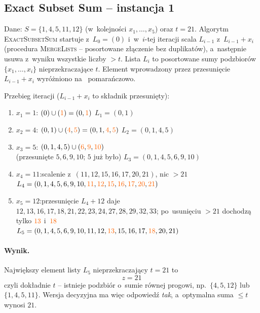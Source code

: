\subsection{Exact Subset Sum -- instancja 1}

Dane: $S = \{1, 4, 5, 11, 12\}$ (w~kolejności $x_1, \ldots, x_5$) oraz $t = 21$.
Algorytm \textsc{ExactSubsetSum} startuje z~$L_0 = (0)$ i~w~$i$-tej iteracji
scala $L_{i-1}$ z~$L_{i-1} + x_i$ (procedura \textsc{MergeLists} -- posortowane
złączenie bez duplikatów), a~następnie usuwa z~wyniku wszystkie liczby $> t$.
Lista $L_i$ to posortowane sumy podzbiorów $\{x_1, \ldots, x_i\}$ nieprzekraczające
$t$. Element wprowadzony przez przesunięcie $L_{i-1} + x_i$ wyróżniono na~%
\textcolor{accentB}{pomarańczowo}.

\begin{dygresja}
	Przebieg iteracji ($L_{i-1} + x_i$ to składnik przesunięty):
	\begin{enumerate}[nosep]
		\item $x_1 = 1$:\quad
		      $(0) \cup (\textcolor{accentB}{1}) = (0, \textcolor{accentB}{1})$
		      \hfill $L_1 = (0, 1)$
		\item $x_2 = 4$:\quad
		      $(0, 1) \cup (\textcolor{accentB}{4}, \textcolor{accentB}{5})
		      = (0, 1, \textcolor{accentB}{4}, \textcolor{accentB}{5})$
		      \hfill $L_2 = (0, 1, 4, 5)$
		\item $x_3 = 5$:\quad
		      $(0, 1, 4, 5) \cup (\textcolor{accentB}{6}, \textcolor{accentB}{9},
		      \textcolor{accentB}{10})$ \\
		      (przesunięte $5, 6, 9, 10$; $5$ już było)
		      \hfill $L_3 = (0, 1, 4, 5, 6, 9, 10)$
		\item $x_4 = 11$:\quad scalenie z~$(11, 12, 15, 16, 17, 20, 21)$, nic $> 21$
		      \hfill\\
		      $L_4 = (0, 1, 4, 5, 6, 9, 10, \textcolor{accentB}{11},
		      \textcolor{accentB}{12}, \textcolor{accentB}{15},
		      \textcolor{accentB}{16}, \textcolor{accentB}{17},
		      \textcolor{accentB}{20}, \textcolor{accentB}{21})$
		\item $x_5 = 12$:\quad przesunięcie $L_4 + 12$ daje
		      $12, 13, 16, 17, 18, 21, 22, 23, 24, 27, 28, 29, 32, 33$;
		      po~usunięciu $> 21$ dochodzą tylko $\textcolor{accentB}{13}$
		      i~$\textcolor{accentB}{18}$ \\
		      $L_5 = (0, 1, 4, 5, 6, 9, 10, 11, 12, \textcolor{accentB}{13}, 15,
		      16, 17, \textcolor{accentB}{18}, 20, 21)$
	\end{enumerate}
\end{dygresja}

\paragraph{Wynik.}
Największy element listy $L_5$ nieprzekraczający $t = 21$ to
\[
	\boxed{z = 21}
\]
czyli dokładnie $t$ -- istnieje podzbiór o~sumie równej progowi, np.\
$\{4, 5, 12\}$ lub $\{1, 4, 5, 11\}$. Wersja decyzyjna ma więc odpowiedź
\emph{tak}, a~optymalna suma $\leq t$ wynosi $21$.

